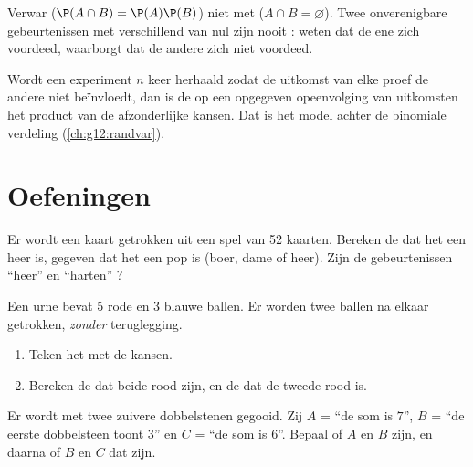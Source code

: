 \begin{remark}
Verwar \emph{} ($\P(A\cap B) = \P(A)\P(B)$) niet met
\emph{} ($A \cap B = \varnothing$). Twee onverenigbare
gebeurtenissen met  verschillend van nul zijn nooit : weten
dat de ene zich voordeed, waarborgt dat de andere zich niet voordeed.
\end{remark}

\begin{definition}\label{def:g12:condprob:repet}
Wordt een experiment $n$ keer herhaald zodat de uitkomst van elke proef de
andere niet beïnvloedt, dan is de  op een opgegeven opeenvolging van
uitkomsten het product van de afzonderlijke kansen. Dat is het model achter
de binomiale verdeling (\cref{ch:g12:randvar}).
\end{definition}

\section{Oefeningen}

\begin{exercise}[$\star$]\label{exo:g12:condprob:1}
Er wordt een kaart getrokken uit een spel van 52 kaarten. Bereken de  dat
het een heer is, gegeven dat het een pop is (boer, dame of heer). Zijn de
gebeurtenissen ``heer'' en ``harten'' ?
\end{exercise}

\begin{exercise}[$\star$]\label{exo:g12:condprob:2}
Een urne bevat 5 rode en 3 blauwe ballen. Er worden twee ballen na elkaar
getrokken, \emph{zonder} teruglegging.
\begin{enumerate}
  \item Teken het  met de kansen.
  \item Bereken de  dat beide rood zijn, en de  dat de tweede rood is.
\end{enumerate}
\end{exercise}

\begin{exercise}[$\star$]\label{exo:g12:condprob:3}
Er wordt met twee zuivere dobbelstenen gegooid. Zij $A$ = ``de som is $7$'',
$B$ = ``de eerste dobbelsteen toont $3$'' en $C$ = ``de som is $6$''. Bepaal
of $A$ en $B$  zijn, en daarna of $B$ en $C$ dat zijn.
\end{exercise}

